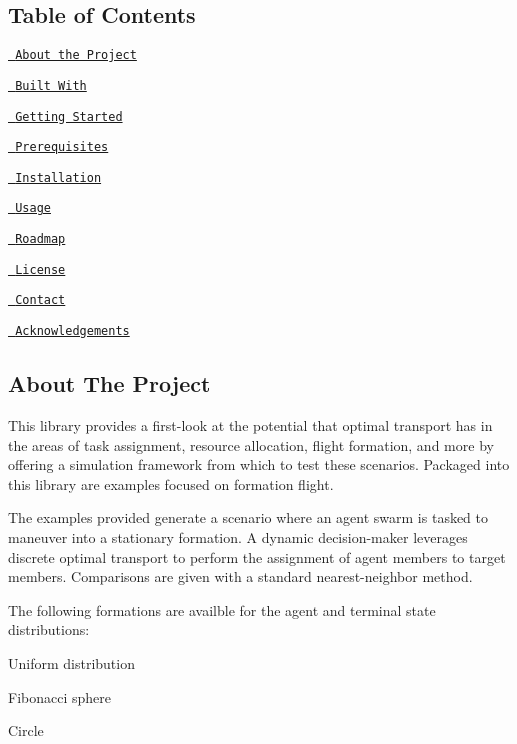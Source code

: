 \subsection*{Table of Contents}


\begin{DoxyItemize}
\item \href{\#about-the-project}{\texttt{ About the Project}}
\begin{DoxyItemize}
\item \href{\#built-with}{\texttt{ Built With}}
\end{DoxyItemize}
\item \href{\#getting-started}{\texttt{ Getting Started}}
\begin{DoxyItemize}
\item \href{\#prerequisites}{\texttt{ Prerequisites}}
\item \href{\#installation}{\texttt{ Installation}}
\end{DoxyItemize}
\item \href{\#usage}{\texttt{ Usage}}
\item \href{\#roadmap}{\texttt{ Roadmap}}
\item \href{\#license}{\texttt{ License}}
\item \href{\#contact}{\texttt{ Contact}}
\item \href{\#acknowledgements}{\texttt{ Acknowledgements}}
\end{DoxyItemize}

\subsection*{About The Project}

This library provides a first-\/look at the potential that optimal transport has in the areas of task assignment, resource allocation, flight formation, and more by offering a simulation framework from which to test these scenarios. Packaged into this library are examples focused on formation flight.

The examples provided generate a scenario where an agent swarm is tasked to maneuver into a stationary formation. A dynamic decision-\/maker leverages discrete optimal transport to perform the assignment of agent members to target members. Comparisons are given with a standard nearest-\/neighbor method.

The following formations are availble for the agent and terminal state distributions\+:
\begin{DoxyItemize}
\item Uniform distribution
\item Fibonacci sphere
\item Circle
\end{DoxyItemize}

